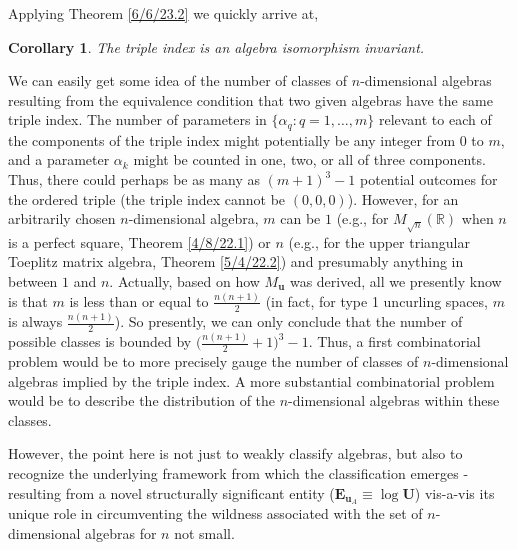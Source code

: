 \documentclass{amsart}
\numberwithin{equation}{section}
\newtheorem{corollary}[theorem]{Corollary}
\theoremstyle{definition}
\numberwithin{theorem}{section}
\begin{document}
Applying Theorem \ref{6/6/23.2} we quickly arrive at,   

\begin{corollary} \label{6/6/23.3} The triple index is an algebra isomorphism invariant.
\end{corollary}

We can easily get some idea of the number of classes of $n$-dimensional algebras resulting from the equivalence condition that two given algebras have the same triple index.  The number of parameters in $\{\alpha_q: q=1,\dots,m\}$ relevant to each of the components of the triple index might potentially be any integer from 0 to $m$, and a parameter $\alpha_k$ might be counted in one, two, or all of three components.   Thus, there could perhaps be as many as $(m+1)^3-1$ potential outcomes for the ordered triple (the triple index cannot be $(0,0,0)$).  However, for an arbitrarily chosen \mbox{$n$-dimensional} algebra, $m$ can be $1$ (e.g., for $M_{\sqrt{n}}(\mathbb{R})$ when $n$ is a perfect square, Theorem \ref{4/8/22.1}) or $n$ (e.g., for the upper triangular Toeplitz matrix algebra, Theorem \ref{5/4/22.2}) and presumably anything in between $1$ and $n$.  Actually,  based on how $M_{\mathbf{u}}$ was derived, all we presently know is that $m$ is less than or equal to $\frac{n(n+1)}{2}$ (in fact, for type 1 uncurling spaces, $m$ is always $\frac{n(n+1)}{2}$).  So presently, we can only conclude that the number of possible classes is bounded by  $\big(\frac{n(n+1)}{2}+1\big)^3-1$.   Thus, a first combinatorial problem would be to more precisely gauge the number of classes of $n$-dimensional algebras implied by the triple index.  A more substantial combinatorial problem would be to describe the distribution of the $n$-dimensional algebras within these classes.
  
   However, the point here is not just to weakly classify algebras, but also to recognize the underlying framework from which the classification emerges - resulting from a novel structurally significant entity ($\mathbf{E}_{\mathbf{u}_A}\equiv\log\mathbf{U}$) vis-a-vis its unique role in circumventing the wildness associated with the set of $n$-dimensional algebras for $n$ not small.
\end{document}
